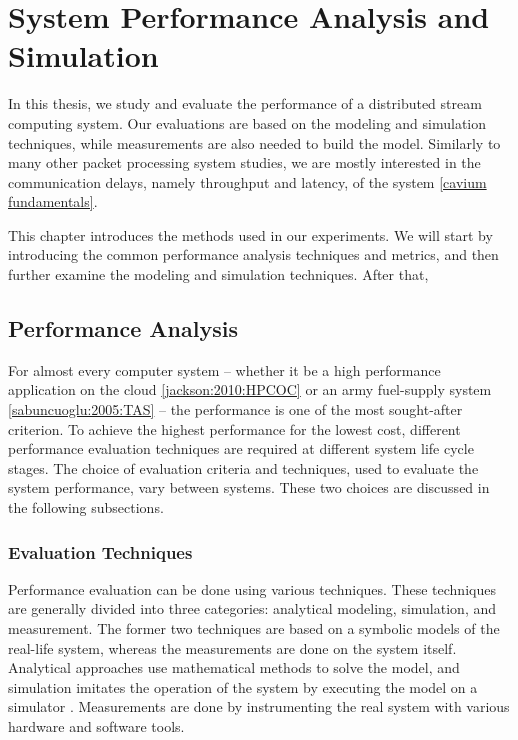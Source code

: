 \chapter{System Performance Analysis and Simulation}
\label{chapter:system-performance-analysis-and-simulation}
In this thesis, we study and evaluate the performance of a distributed stream computing system. Our evaluations are based on the modeling and simulation techniques, while measurements are also needed to build the model. Similarly to many other packet processing system studies, we are mostly interested in the communication delays, namely throughput and latency, of the system \ref{cavium fundamentals}.

This chapter introduces the methods used in our experiments. We will start by introducing the common performance analysis techniques and metrics, and then further examine the modeling and simulation techniques. After that, 

\section{Performance Analysis}
For almost every computer system -- whether it be a high performance application on the cloud \ref{jackson:2010:HPCOC} or an army fuel-supply system \ref{sabuncuoglu:2005:TAS} -- the performance is one of the most sought-after criterion. To achieve the highest performance for the lowest cost, different performance evaluation techniques are required at different system life cycle stages. The choice of evaluation criteria and techniques, used to evaluate the system performance, vary between systems. These two choices are discussed in the following subsections. \cite{jain:1991:AOCSPA}

\subsection{Evaluation Techniques}
Performance evaluation can be done using various techniques. These techniques are generally divided into three categories: analytical modeling, simulation, and measurement. The former two techniques are based on a symbolic models of the real-life system, whereas the measurements are done on the system itself. Analytical approaches use mathematical methods to solve the model, and simulation imitates the operation of the system by executing the model on a simulator \cite{Banks:2010:DES}. Measurements are done by instrumenting the real system with various hardware and software tools. \cite{jain:1991:AOCSPA}

